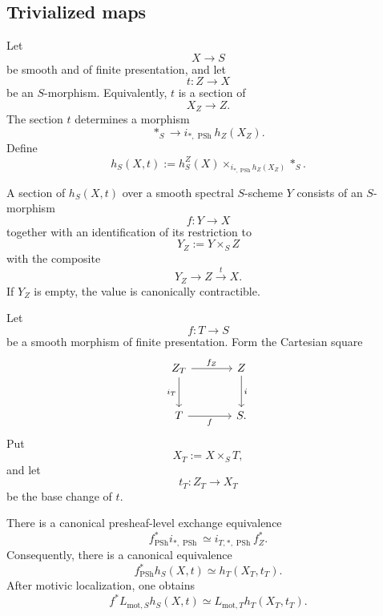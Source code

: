 \subsection{Trivialized maps}

\begin{construction}
\label{con:presheaf-z-trivialized-maps}
Let
\[
    X
    \longrightarrow
    S
\]
be smooth and of finite presentation, and let
\[
    t
    \colon
    Z
    \longrightarrow
    X
\]
be an \(S\)-morphism.  Equivalently, \(t\) is a section of
\[
    X_Z
    \longrightarrow
    Z.
\]
The section \(t\) determines a morphism
\[
    *_S
    \longrightarrow
    i_{*,\operatorname{PSh}}h_Z(X_Z).
\]
Define
\[
    h_S(X,t)
    :=
    h_S^Z(X)
    \times_{i_{*,\operatorname{PSh}}h_Z(X_Z)}
    *_S.
\]
\end{construction}

A section of \(h_S(X,t)\) over a smooth spectral \(S\)-scheme
\(Y\) consists of an \(S\)-morphism
\[
    f
    \colon
    Y
    \longrightarrow
    X
\]
together with an identification of its restriction to
\[
    Y_Z
    :=
    Y\times_SZ
\]
with the composite
\[
    Y_Z
    \longrightarrow
    Z
    \xrightarrow{t}
    X.
\]
If \(Y_Z\) is empty, the value is canonically contractible.

\begin{proposition}
\label{prop:trivialized-map-base-change}
Let
\[
    f
    \colon
    T
    \longrightarrow
    S
\]
be a smooth morphism of finite presentation.  Form the Cartesian square
\[
\begin{tikzcd}[column sep=large, row sep=large]
    Z_T
        \arrow[r, "f_Z"]
        \arrow[d, "i_T"']
    &
    Z
        \arrow[d, "i"]
    \\
    T
        \arrow[r, "f"']
    &
    S.
\end{tikzcd}
\]
Put
\[
    X_T
    :=
    X\times_ST,
\]
and let
\[
    t_T
    \colon
    Z_T
    \longrightarrow
    X_T
\]
be the base change of \(t\).

There is a canonical presheaf-level exchange equivalence
\[
    f^*_{\operatorname{PSh}}
    i_{*,\operatorname{PSh}}
    \simeq
    i_{T,*,\operatorname{PSh}}
    f_Z^*.
\]
Consequently, there is a canonical equivalence
\[
    f^*_{\operatorname{PSh}}h_S(X,t)
    \simeq
    h_T(X_T,t_T).
\]
After motivic localization, one obtains
\[
    f^*L_{\mathrm{mot},S}h_S(X,t)
    \simeq
    L_{\mathrm{mot},T}h_T(X_T,t_T).
\]
\end{proposition}

